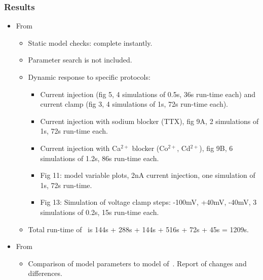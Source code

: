 \documentclass[12pt]{article}
\begin{document}
\subsubsection*{Results}

\begin{itemize}
\item From~\cite{De-Schutter-E:1994vn}

  \begin{itemize}
  \item Static model checks: complete instantly.
  \item Parameter search is not included.
  \item Dynamic response to specific protocols:
    \begin{itemize}
    \item Current injection (fig 5, 4 simulations of 0.5s, 36s
      run-time each) and current clamp (fig 3, 4 simulations of 1s,
      72s run-time each).
    \item Current injection with sodium blocker (TTX), fig 9A, 2
      simulations of 1s, 72s run-time each.
    \item Current injection with Ca$^{2+}$ blocker (Co$^{2+}$,
      Cd$^{2+}$), fig 9B, 6 simulations of 1.2s, 86s run-time each.
    \item Fig 11: model variable plots, 2nA current injection, one
      simulation of 1s, 72s run-time.
    \item Fig 13: Simulation of voltage clamp steps: -100mV, +40mV,
      -40mV, 3 simulations of 0.2s, 15s run-time each.
    \end{itemize}

  \item Total run-time of~\cite{De-Schutter-E:1994vn} is 144s + 288s +
    144s + 516s + 72s + 45s = 1209s.
  \end{itemize}


\item From~\cite{E:1994hc}

  \begin{itemize}
  \item Comparison of model parameters to model
    of~\cite{De-Schutter-E:1994vn}.  Report of changes and
    differences.


\end{itemize}
\end{itemize}
\end{document}
